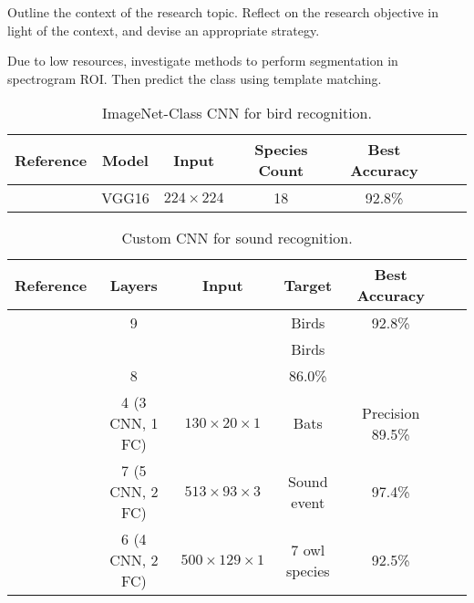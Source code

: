 Outline the context of the research topic. Reflect on the research objective in light of the context, and devise an appropriate strategy.

Due to low resources, investigate methods to perform segmentation in spectrogram ROI. Then predict the class using template matching. 


\begin{table}
\renewcommand{\arraystretch}{1}
\small
\centering
\caption{ImageNet-Class CNN for bird recognition.}
\begin{tabular}{lcccccc}
\toprule
\textbf{Reference} & \textbf{Model} & \textbf{Input} & \textbf{Species Count} & \textbf{Best Accuracy} \\
\midrule
\cite{Xie2017} & VGG16 & $224\times 224$& 18 & 92.8\% \\
\bottomrule
\end{tabular}
\end{table}




\begin{table}[H]
\renewcommand{\arraystretch}{1}
\small
\centering
\caption{Custom CNN for sound recognition.}
\begin{tabular}{lcccccc}
\toprule
\textbf{Reference} & \textbf{Layers} & \textbf{Input} & \textbf{Target} & \textbf{Best Accuracy} \\
\midrule
\cite{Takahashi2016} & 9 & & Birds & 92.8\% \\
\cite{Grill2017} & && Birds & \\
\cite{Meyer2017} & 8 & & 86.0\% \\
\cite{MacAodha2018} & 4 (3 CNN, 1 FC) & $130\times 20\times 1$  & Bats & Precision 89.5\% \\
\cite{Ozer2018} & 7 (5 CNN, 2 FC) & $513\times 93\times 3$ & Sound event & 97.4\% \\
\cite{Ruff2019} & 6 (4 CNN, 2 FC) & $500\times 129\times 1$ & 7 owl species & 92.5\% \\
\bottomrule
\end{tabular}
\end{table}
